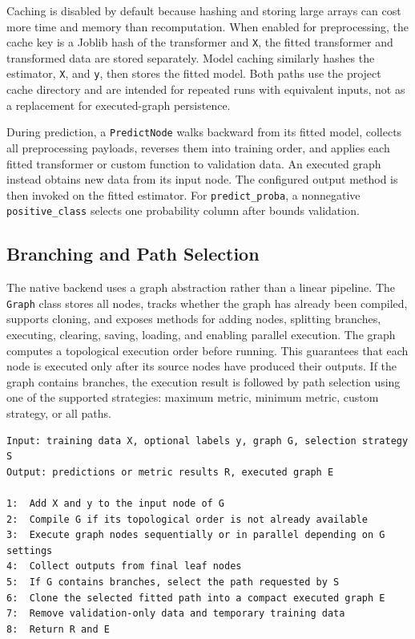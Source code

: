 Caching is disabled by default because hashing and storing large arrays can cost
more time and memory than recomputation. When enabled for preprocessing, the
cache key is a Joblib hash of the transformer and \texttt{X}, the fitted
transformer and transformed data are stored separately. Model caching similarly
hashes the estimator, \texttt{X}, and \texttt{y}, then stores the fitted model.
Both paths use the project cache directory and are intended for repeated runs
with equivalent inputs, not as a replacement for executed-graph persistence.

During prediction, a \texttt{PredictNode} walks backward from its fitted model,
collects all preprocessing payloads, reverses them into training order, and
applies each fitted transformer or custom function to validation data. An
executed graph instead obtains new data from its input node. The configured
output method is then invoked on the fitted estimator. For
\texttt{predict\_proba}, a nonnegative \texttt{positive\_class} selects one
probability column after bounds validation.

\subsection{Branching and Path Selection}

The native backend uses a graph abstraction rather than a linear pipeline. The
\texttt{Graph} class stores all nodes, tracks whether the graph has already been
compiled, supports cloning, and exposes methods for adding nodes, splitting
branches, executing, clearing, saving, loading, and enabling parallel execution.
The graph computes a topological execution order before running. This guarantees
that each node is executed only after its source nodes have produced their outputs.
If the graph contains branches, the execution result is followed by path selection
using one of the supported strategies: maximum metric, minimum metric, custom
strategy, or all paths.

\begin{lstlisting}[style=algostyle,caption={High-level Accelera Pipe training flow},label={alg:pipeline-training-flow}]
Input: training data X, optional labels y, graph G, selection strategy S
Output: predictions or metric results R, executed graph E

1:  Add X and y to the input node of G
2:  Compile G if its topological order is not already available
3:  Execute graph nodes sequentially or in parallel depending on G settings
4:  Collect outputs from final leaf nodes
5:  If G contains branches, select the path requested by S
6:  Clone the selected fitted path into a compact executed graph E
7:  Remove validation-only data and temporary training data
8:  Return R and E
\end{lstlisting}

